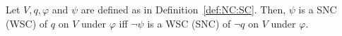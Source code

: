 \documentclass{article}
\begin{document}





\begin{proposition}[Dual]\label{dual}
 Let $V,q,\varphi$ and $\psi$ are defined as in Definition~\ref{def:NC:SC}.
 Then, $\psi$ is a SNC (WSC) of $q$ on $V$ under $\varphi$ iff $\neg \psi$ is a WSC (SNC)
    of $\neg q$ on $V$ under $\varphi$.
\end{proposition}

%
\end{document}
